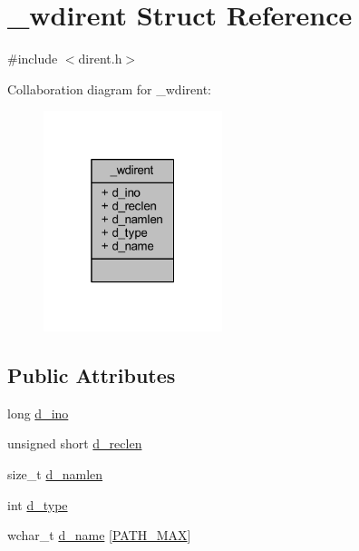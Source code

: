 \hypertarget{struct__wdirent}{\section{\+\_\+wdirent Struct Reference}
\label{struct__wdirent}
}


{\ttfamily \#include $<$dirent.\+h$>$}



Collaboration diagram for \+\_\+wdirent\+:
\nopagebreak
\begin{figure}[H]
\begin{center}
\leavevmode
\includegraphics[width=148pt]{struct__wdirent__coll__graph}
\end{center}
\end{figure}
\subsection*{Public Attributes}
\begin{DoxyCompactItemize}
\item 
long \hyperlink{struct__wdirent_ac8cfaf294a0b6a49287d3f384c280c93}{d\+\_\+ino}
\item 
unsigned short \hyperlink{struct__wdirent_aff7f360608e576cd18cf11f2caf13ef3}{d\+\_\+reclen}
\item 
size\+\_\+t \hyperlink{struct__wdirent_a0050d6131e6fa90206903e216b38799e}{d\+\_\+namlen}
\item 
int \hyperlink{struct__wdirent_a3c3874604ffccbeeaffd96709763cc3b}{d\+\_\+type}
\item 
wchar\+\_\+t \hyperlink{struct__wdirent_a267f915cd36cad5969337a9192cab567}{d\+\_\+name} \mbox{[}\hyperlink{dirent_8h_ae688d728e1acdfe5988c7db45d6f0166}{P\+A\+T\+H\+\_\+\+M\+A\+X}\mbox{]}
\end{DoxyCompactItemize}


